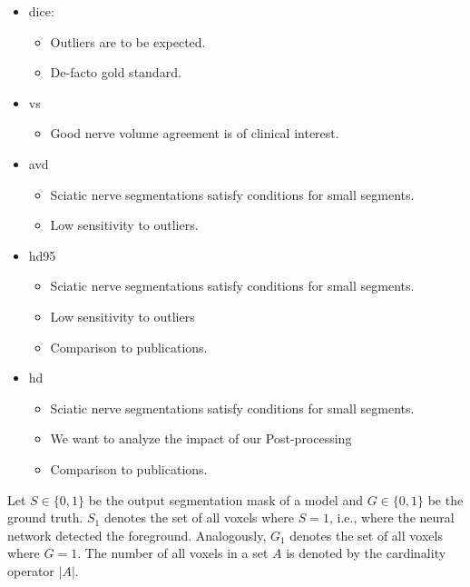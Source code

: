 \begin{itemize}
\item \acrlong{dice}:
  \begin{itemize}
  \item Outliers are to be expected.
  \item De-facto gold standard.
  \end{itemize}
\item \acrlong{vs}
  \begin{itemize}
  \item Good nerve volume agreement is of clinical interest.
  \end{itemize}
\item \acrlong{avd}
  \begin{itemize}
  \item Sciatic nerve segmentations satisfy conditions for small segments.
  \item Low sensitivity to outliers.
  \end{itemize}
\item \acrlong{hd95}
  \begin{itemize}
  \item Sciatic nerve segmentations satisfy conditions for small segments.
  \item Low sensitivity to outliers
  \item Comparison to publications.
  \end{itemize}
\item \acrlong{hd}
  \begin{itemize}
  \item Sciatic nerve segmentations satisfy conditions for small segments.
  \item We want to analyze the impact of our Post-processing
  \item Comparison to publications.
  \end{itemize}
\end{itemize}

Let $S \in \{0, 1\}$ be the output segmentation mask of a model and $G \in \{0, 1\}$ be the ground truth.
$S_{1}$ denotes the set of all voxels where $S = 1$, i.e., where the neural network detected the foreground. Analogously, $G_{1}$ denotes the set of all voxels where $G = 1$. The number of all voxels in a set $A$ is denoted by the cardinality operator $|A|$.

